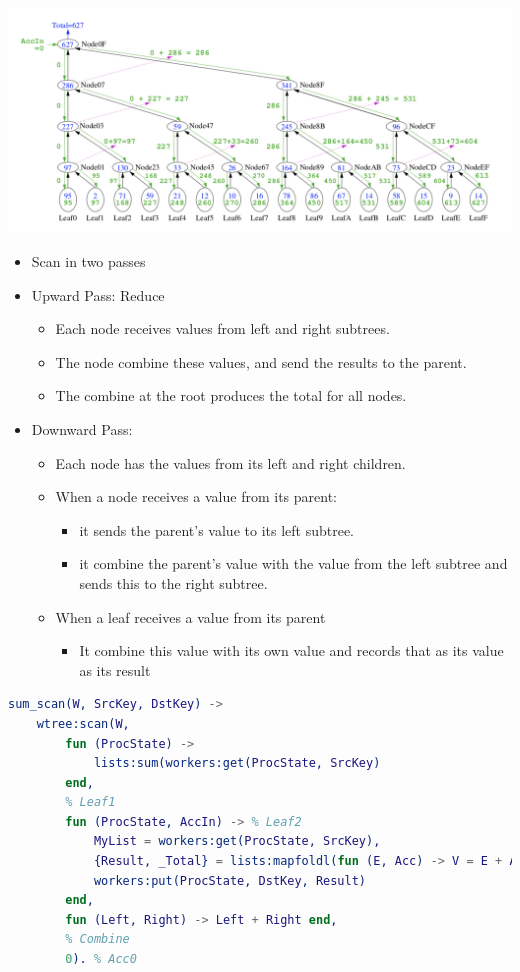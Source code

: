 \documentclass[../main.tex]{subfiles}
\begin{document}
\begin{center}
    \includegraphics[scale=0.5]{images/scan.png}
\end{center}

\begin{itemize}
    \item Scan in two passes    
	\item Upward Pass: Reduce
	      \begin{itemize}
		      \item Each node receives values from left and right subtrees.
		      \item The node combine these values, and send the results to the parent.
		      \item The combine at the root produces the total for all nodes.
	      \end{itemize}
	\item Downward Pass:
	      \begin{itemize}
		      \item Each node has the values from its left and right children.
		      \item When a node receives a value from its parent:
		            \begin{itemize}
			            \item it sends the parent's value to its left subtree.
			            \item it combine the parent's value with the value from the left subtree and sends this to the right subtree.
		            \end{itemize}
		      \item When a leaf receives a value from its parent
		            \begin{itemize}
			            \item It combine this value with its own value and records that as its value as its result
		            \end{itemize}
	      \end{itemize}
\end{itemize}

\begin{lstlisting}[language=erlang]
    sum_scan(W, SrcKey, DstKey) ->
    wtree:scan(W,
        fun (ProcState) ->
            lists:sum(workers:get(ProcState, SrcKey)
        end,
        % Leaf1
        fun (ProcState, AccIn) -> % Leaf2
            MyList = workers:get(ProcState, SrcKey),
            {Result, _Total} = lists:mapfoldl(fun (E, Acc) -> V = E + Acc, {V, V} end, AccIn, MyList),
            workers:put(ProcState, DstKey, Result)
        end,
        fun (Left, Right) -> Left + Right end,
        % Combine
        0). % Acc0
\end{lstlisting}
\end{document}
